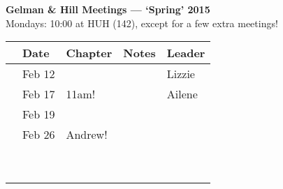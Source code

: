 \documentclass[11pt]{article}
\begin{document}
 
\raggedright
{}

\begin{center} 
{\large \textbf{Gelman \& Hill Meetings --- `Spring' 2015}} \\ [2pt]
Mondays: 10:00 at HUH (142), except for a few extra meetings!\\
\end{center} 

\begin{center}
\begin{tabular}{ p{0.7 cm}  p{1.5 cm}  p{5 cm}  p{5 cm}  p{1.5 cm} }  \hline \hline
 & \textbf{Date}
   & \textbf{Chapter}
      & \textbf{Notes} 
         & \textbf{Leader} \\ 
\hline \hline
 & Feb 12  &   &        & Lizzie \\\hline
 & Feb 17  & 11am!   &   & Ailene  \\\hline
 & Feb 19  &  &      &   \\\hline
 & Feb 26 & Andrew!  &   &   \\\hline
 &  & &        &   \\\hline
 &  &     &  &  \\\hline
 &  &  &        &  \\\hline
 &  &    &   &   \\\hline
 &  &    &  &  \\\hline
 &  &    &  &   \\\hline
 &  &   &  &   \\\hline
 &  &        & & \\\hline
 & &     & & \\\hline
\hline
\end{tabular}
\end{center}
\end{document}

